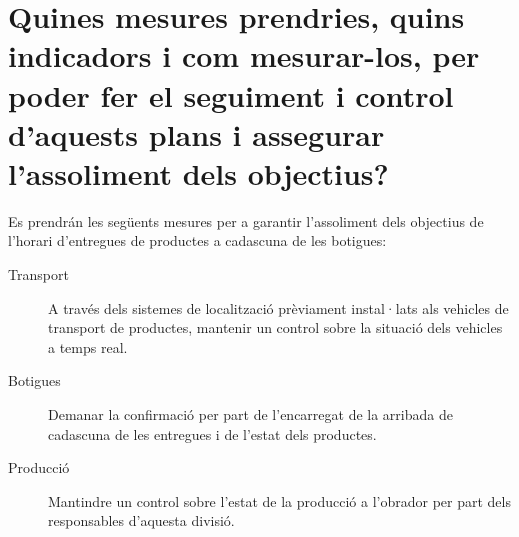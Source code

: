 \section{Quines mesures prendries, quins indicadors i com mesurar-los, per poder fer el seguiment i control
d’aquests plans i assegurar l’assoliment dels objectius?}

Es prendrán les següents mesures per a garantir l'assoliment dels objectius de l'horari d'entregues de productes a cadascuna de les botigues:

\begin{description}
  \item[Transport] A través dels sistemes de localització prèviament instal·lats als vehicles de transport de productes, mantenir un control sobre la situació dels vehicles a temps real.
  \item[Botigues] Demanar la confirmació per part de l'encarregat de la arribada de cadascuna de les entregues i de l'estat dels productes.
  \item[Producció] Mantindre un control sobre l'estat de la producció a l'obrador per part dels responsables d'aquesta divisió.
\end{description}
